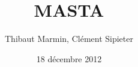 
\title{MASTA}
\author{Thibaut Marmin, Clément Sipieter}
\date{18 décembre 2012}

\newcommand{\method}[1]{\texttt{{#1}}}
\newcommand{\class}[1]{\texttt{{#1}}}
\newcommand{\package}[1]{\textbf{{#1}}}

